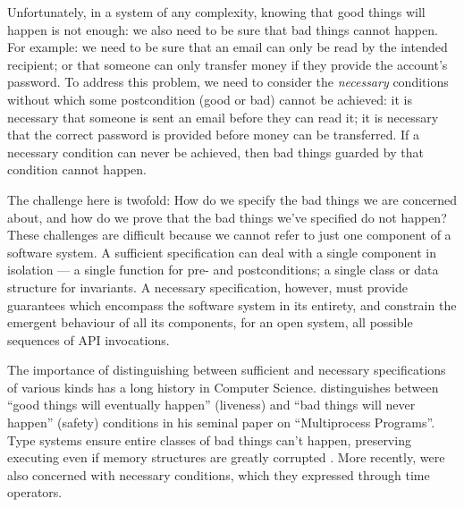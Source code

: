 Unfortunately, in a system of any complexity, knowing that good things
will happen is not enough: we also need to be sure that bad things
cannot happen. For example: we  need to be sure that an email can
only be read by the intended recipient; or that someone can only transfer
money if they provide the account's password. To address this problem,
we need to consider the \emph{necessary} conditions without which some
postcondition (good or bad) cannot be achieved:
it is necessary that someone is sent an email before they can read it;
it is necessary that the correct password is provided before money can
be transferred.  If a necessary condition can never be achieved, then
bad things guarded by that condition cannot happen. 

The challenge here is twofold: How do we specify the bad things we are
concerned about, and how do we prove that the bad things we've
specified do not happen?  These challenges are difficult because we
cannot refer to just one component of a software system.  A sufficient
specification can deal with a single component in isolation --- a
single function for pre- and postconditions; a single class or data
structure for invariants. A necessary specification, however, must
provide guarantees which encompass the software system in its
entirety, and constrain the emergent behaviour of all its components,
for an open system, all possible sequences of API invocations.



The importance of distinguishing between sufficient and necessary
specifications of various kinds has a long history in Computer
Science. \citeauthor{Lamport77} distinguishes between ``good things
will eventually happen'' (liveness) and ``bad things will never
happen'' (safety) conditions in his seminal paper on ``Multiprocess
Programs''.  Type systems ensure entire classes of bad things can't
happen, preserving executing even if memory structures are greatly
corrupted \cite{Rinard03}.
More recently, \citeauthor{FASE} were also concerned with 
 necessary conditions, which they expressed through time operators.
 
